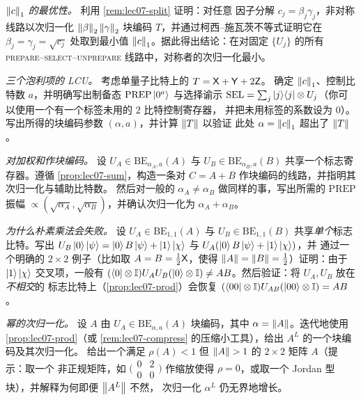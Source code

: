 \begin{exercise}\label{ex:lec07-2}
\emph{$\left\lVert c \right\rVert_1$ 的最优性。} 利用 \cref{rem:lec07-split} 证明：对任意
因子分解 $c_j=\beta_j\gamma_j$，非对称线路以次归一化 $\left\lVert \beta \right\rVert_2\left\lVert \gamma \right\rVert_2$
块编码 $T$，并通过柯西--施瓦茨不等式证明它在 $\beta_j=\gamma_j=\sqrt{c_j}$ 处取到最小值
$\left\lVert c \right\rVert_1$。据此得出结论：在对固定 $\{U_j\}$ 的所有
\textsc{prepare}--\textsc{select}--\textsc{unprepare} 线路中，对称者的次归一化最小。
\end{exercise}

\begin{exercise}\label{ex:lec07-3}
\emph{三个泡利项的 LCU。} 考虑单量子比特上的 $T=\mathsf{X}+\mathsf{Y}+2\mathsf{Z}$。
确定 $\left\lVert c \right\rVert_1$、控制比特数 $a$，并明确写出制备态 $\mathrm{PREP}\ket{0^a}$ 与选择谕示
$\mathrm{SEL}=\sum_j\ket{j}\!\bra{j}\otimes U_j$（你可以使用一个有一个标签未用的 $2$ 比特控制寄存器，
并把未用标签的系数设为 $0$）。写出所得的块编码参数 $(\alpha,a)$，并计算 $\left\lVert T \right\rVert$ 以验证
此处 $\alpha=\left\lVert c \right\rVert_1$ 超出了 $\left\lVert T \right\rVert$。
\end{exercise}

\begin{exercise}\label{ex:lec07-4}
\emph{对加权和作块编码。} 设 $U_A\in\mathrm{BE}_{\alpha_A,a}(A)$ 与
$U_B\in\mathrm{BE}_{\alpha_B,a}(B)$ 共享一个标志寄存器。遵循
\cref{prop:lec07-sum}，构造一条对 $C=A+B$ 作块编码的线路，并指明其次归一化与辅助比特数。
然后对一般的 $\alpha_A\ne\alpha_B$ 做同样的事，写出所需的 $\mathrm{PREP}$ 振幅
$\propto(\sqrt{\alpha_A},\sqrt{\alpha_B})$，并确认次归一化为
$\alpha_A+\alpha_B$。
\end{exercise}

\begin{exercise}\label{ex:lec07-5}
\emph{为什么朴素乘法会失败。} 设 $U_A\in\mathrm{BE}_{1,1}(A)$ 与
$U_B\in\mathrm{BE}_{1,1}(B)$ 共享\emph{单个}标志比特。写出 $U_B\ket0\ket
\psi=\ket0 B\ket\psi+\ket1\ket{\chi}$ 与 $U_A(\ket0 B\ket\psi+\ket1\ket\chi)$，并
通过一个明确的 $2\times2$ 例子（比如取 $A=B=\tfrac12\mathsf{X}$，使得
$\left\lVert A \right\rVert=\left\lVert B \right\rVert=\tfrac12$）证明：由于 $\ket1\ket\chi$ 交叉项，一般有
$(\bra0\otimes\mathbb{I})U_AU_B(\ket0\otimes\mathbb{I})\ne AB$。然后验证：将 $U_A,U_B$ 放在\emph{不相交}的
标志比特上（\cref{prop:lec07-prod}）会恢复 $(\bra{00}\otimes\mathbb{I})U_{AB}
(\ket{00}\otimes\mathbb{I})=AB$。
\end{exercise}

\begin{exercise}\label{ex:lec07-6}
\emph{幂的次归一化。} 设 $A$ 由
$U_A\in\mathrm{BE}_{\alpha,a}(A)$ 块编码，其中 $\alpha=\left\lVert A \right\rVert$。迭代地使用
\cref{prop:lec07-prod}（或 \cref{rem:lec07-compress} 的压缩小工具），给出
$A^L$ 的一个块编码及其次归一化。
给出一个满足 $\rho(A)<1$ 但 $\left\lVert A \right\rVert>1$ 的 $2\times2$ 矩阵 $A$（提示：取一个
非正规矩阵，如 $\bigl(\begin{smallmatrix}0&2\\0&0\end{smallmatrix}\bigr)$
作缩放使得 $\rho=0$，或取一个 Jordan 型块），并解释为何即便 $\left\lVert A^L \right\rVert$ 不然，
次归一化 $\alpha^L$ 仍无界地增长。
\end{exercise}

